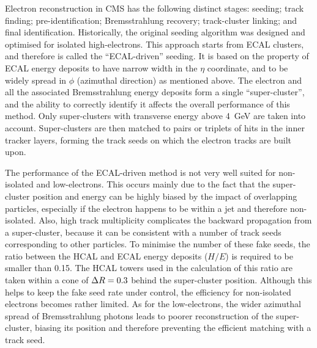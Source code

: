 Electron reconstruction in CMS has the following distinct stages: seeding; track finding; pre-identification;
Bremsstrahlung recovery; track-cluster linking; and final identification. Historically, the original seeding algorithm
was designed and optimised for isolated high-\pt electrons. This approach starts from ECAL clusters, and therefore is
called the ``ECAL-driven'' seeding. It is based on the property of ECAL energy deposits to have narrow width in the
$\eta$ coordinate, and to be widely spread in $\phi$ (azimuthal direction) as mentioned above. The electron and all the
associated Bremsstrahlung energy deposits form a single ``super-cluster'', and the ability to correctly identify it
affects the overall performance of this method. Only super-clusters with transverse energy above \SI{4}{\GeV} are taken
into account. Super-clusters are then matched to pairs or triplets of hits in the inner tracker layers, forming the
track seeds on which the electron tracks are built upon.

The performance of the ECAL-driven method is not very well suited for non-isolated and low-\pt electrons. This occurs
mainly due to the fact that the super-cluster position and energy can be highly biased by the impact of overlapping
particles, especially if the electron happens to be within a jet and therefore non-isolated. Also, high track
multiplicity complicates the backward propagation from a super-cluster, because it can be consistent with a number of
track seeds corresponding to other particles. To minimise the number of these fake seeds, the ratio between the HCAL and
ECAL energy deposits ($H/E$) is required to be smaller than \num{0.15}. The HCAL towers used in the calculation of this
ratio are taken within a cone of $\Delta R = 0.3$ behind the super-cluster position. Although this helps to keep the fake
seed rate under control, the efficiency for non-isolated electrons becomes rather limited. As for the low-\pt electrons,
the wider azimuthal spread of Bremsstrahlung photons leads to poorer reconstruction of the super-cluster, biasing its
position and therefore preventing the efficient matching with a track seed.

